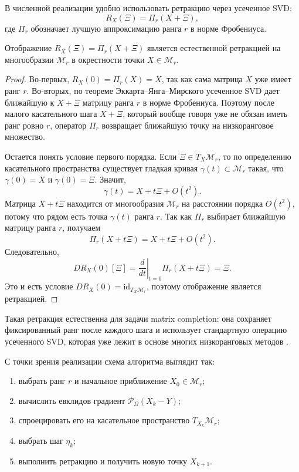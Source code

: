 \documentclass[a4paper,12pt]{article}
\renewcommand{\Proj}{\mathcal{P}}
\newcommand{\Mcal}{\mathcal{M}}
\begin{document}
В численной реализации удобно использовать ретракцию через усеченное SVD:
\begin{equation}
\label{eq:fixed-rank-retraction}
R_X(\Xi)=\Pi_r(X+\Xi),
\end{equation}
где $\Pi_r$ обозначает лучшую аппроксимацию ранга $r$ в норме Фробениуса.

\begin{proposition}
Отображение $R_X(\Xi)=\Pi_r(X+\Xi)$ является естественной ретракцией на многообразии $\Mcal_r$ в окрестности точки $X\in\Mcal_r$.
\end{proposition}

\begin{proof}
Во-первых, $R_X(0)=\Pi_r(X)=X$, так как сама матрица $X$ уже имеет ранг $r$. Во-вторых, по теореме Эккарта--Янга--Мирского усеченное SVD дает ближайшую к $X+\Xi$ матрицу ранга $r$ в норме Фробениуса. Поэтому после малого касательного шага $X+\Xi$, который вообще говоря уже не обязан иметь ранг ровно $r$, оператор $\Pi_r$ возвращает ближайшую точку на низкоранговое множество.

Остается понять условие первого порядка. Если $\Xi\in T_X\Mcal_r$, то по определению касательного пространства существует гладкая кривая $\gamma(t)\subset\Mcal_r$ такая, что $\gamma(0)=X$ и $\dot\gamma(0)=\Xi$. Значит,
\[
\gamma(t)=X+t\Xi+O(t^2).
\]
Матрица $X+t\Xi$ находится от многообразия $\Mcal_r$ на расстоянии порядка $O(t^2)$, потому что рядом есть точка $\gamma(t)$ ранга $r$. Так как $\Pi_r$ выбирает ближайшую матрицу ранга $r$, получаем
\[
\Pi_r(X+t\Xi)=X+t\Xi+O(t^2).
\]
Следовательно,
\[
DR_X(0)[\Xi]=\left.\frac{d}{dt}\right|_{t=0}\Pi_r(X+t\Xi)=\Xi.
\]
Это и есть условие $DR_X(0)=\mathrm{id}_{T_X\Mcal_r}$, поэтому отображение является ретракцией.
\end{proof}

Такая ретракция естественна для задачи matrix completion: она сохраняет фиксированный ранг после каждого шага и использует стандартную операцию усеченного SVD, которая уже лежит в основе многих низкоранговых методов \cite{vandereycken}.

С точки зрения реализации схема алгоритма выглядит так:
\begin{enumerate}[label=\arabic*.]
    \item выбрать ранг $r$ и начальное приближение $X_0 \in \Mcal_r$;
    \item вычислить евклидов градиент $\Proj_\Omega(X_k-Y)$;
    \item спроецировать его на касательное пространство $T_{X_k}\Mcal_r$;
    \item выбрать шаг $\eta_k$;
    \item выполнить ретракцию и получить новую точку $X_{k+1}$.
\end{enumerate}
\end{document}
